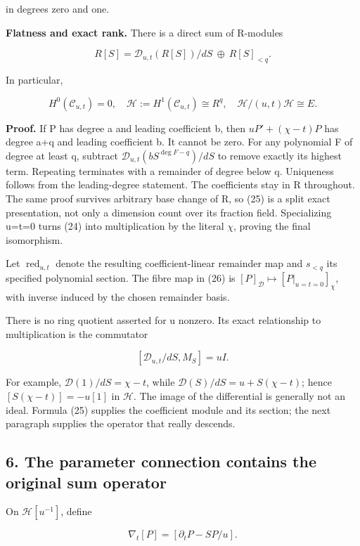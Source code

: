 \documentclass[
  11pt,
]{article}
\begin{document}
in degrees zero and one.

\textbf{Flatness and exact rank.} There is a direct sum of R-modules

\[
\boxed{R[S]=\mathcal D_{u,t}(R[S])/dS\ \oplus\ R[S]_{<q}.}
\tag{25}
\]

In particular,

\[
\boxed{H^0(\mathcal C_{u,t})=0,\quad
\mathcal H:=H^1(\mathcal C_{u,t})\cong R^q,
\quad \mathcal H/(u,t)\mathcal H\cong E.}
\tag{26}
\]

\textbf{Proof.} If P has degree a and leading coefficient b, then
\(uP'+(\chi-t)P\) has degree a+q and leading coefficient b. It cannot be
zero. For any polynomial F of degree at least q, subtract
\(\mathcal D_{u,t}(bS^{\deg F-q})/dS\) to remove exactly its highest
term. Repeating terminates with a remainder of degree below q.
Uniqueness follows from the leading-degree statement. The coefficients
stay in R throughout. The same proof survives arbitrary base change of
R, so (25) is a split exact presentation, not only a dimension count
over its fraction field. Specializing u=t=0 turns (24) into
multiplication by the literal \(\chi\), proving the final isomorphism.

Let \(\operatorname{red}_{u,t}\) denote the resulting coefficient-linear
remainder map and \(s_{<q}\) its specified polynomial section. The fibre
map in (26) is \([P]_{\mathcal D}\mapsto[P|_{u=t=0}]_\chi\), with
inverse induced by the chosen remainder basis.

There is no ring quotient asserted for u nonzero. Its exact relationship
to multiplication is the commutator

\[
[\mathcal D_{u,t}/dS,M_S]=uI.
\tag{27}
\]

For example, \(\mathcal D(1)/dS=\chi-t\), while
\(\mathcal D(S)/dS=u+S(\chi-t)\); hence \([S(\chi-t)]=-u[1]\) in
\(\mathcal H\). The image of the differential is generally not an ideal.
Formula (25) supplies the coefficient module and its section; the next
paragraph supplies the operator that really descends.

\subsection{6. The parameter connection contains the original sum
operator}\label{the-parameter-connection-contains-the-original-sum-operator}

On \(\mathcal H[u^{-1}]\), define

\[
\nabla_t[P]=[\partial_tP-S P/u].
\tag{28}
\]
\end{document}
